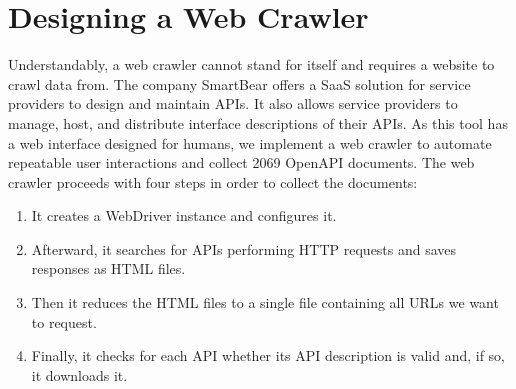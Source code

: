 \section {Designing a Web Crawler}
\label{sec:designing_a_web_crawler}
Understandably, a web crawler cannot stand for itself and requires a website to crawl data from.
The company SmartBear offers a SaaS solution for service providers to design and maintain APIs. It also allows service providers to manage, host, and distribute interface descriptions of their APIs. 
As this tool has a web interface designed for humans, we implement a web crawler to automate repeatable user interactions and collect 2069 OpenAPI documents.
\newline
The web crawler proceeds with four steps in order to collect the documents:
\begin{enumerate}
    \item It creates a WebDriver instance and configures it.
    \item Afterward, it searches for APIs performing HTTP requests and saves responses as HTML files.
    \item Then it reduces the HTML files to a single file containing all URLs we want to request.
    \item Finally, it checks for each API whether its API description is valid and, if so, it downloads it.  
\end{enumerate} 




